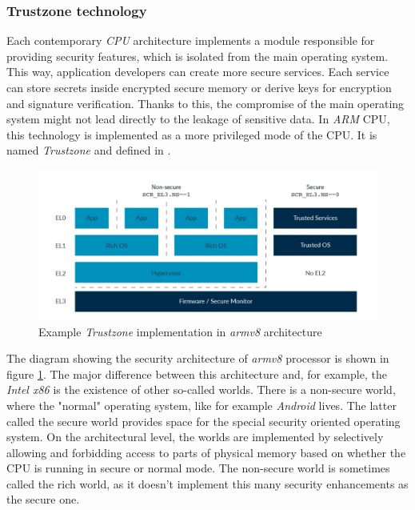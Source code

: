 \subsubsection{Trustzone technology} \label{sec:tz}
Each contemporary \textit{CPU} architecture implements a module responsible for providing security features, which is isolated from the main operating system. This way, application developers can create more secure services. Each service can store secrets inside encrypted secure memory or derive keys for encryption and signature verification. Thanks to this, the compromise of the main operating system might not lead directly to the leakage of sensitive data. In \textit{ARM} CPU, this technology is implemented as a more privileged mode of the CPU. It is named \textit{Trustzone} and defined in \cite{trustzonedoc}.

\begin{figure}
    \centering
    \includegraphics[width=.9\linewidth]{tex/img/trustzone.jpg}
    \caption{Example \textit{Trustzone} implementation in \textit{armv8} architecture}
    \label{fig:tzarmv8}
\end{figure}

The diagram showing the security architecture of \textit{armv8} processor is shown in figure \ref{fig:tzarmv8}. The major difference between this architecture and, for example, the \textit{Intel x86} is the existence of other so-called worlds. There is a non-secure world, where the "normal" operating system, like for example \textit{Android} lives. The latter called the secure world provides space for the special security oriented operating system. On the architectural level, the worlds are implemented by selectively allowing and forbidding access to parts of physical memory based on whether the CPU is running in secure or normal mode. The non-secure world is sometimes called the rich world, as it doesn't implement this many security enhancements as the secure one.

